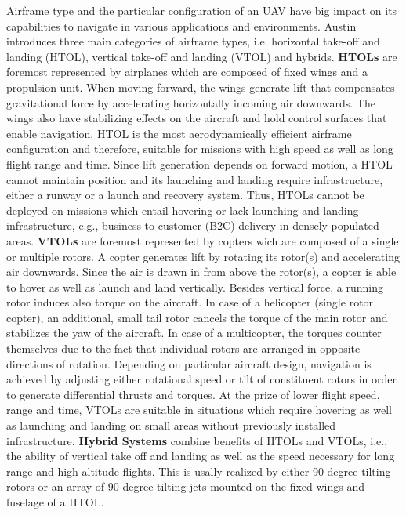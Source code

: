 Airframe type and 
the particular configuration
of an UAV
have big impact on its
capabilities to navigate in
various applications 
and environments.
\cite{Kong2010}
Austin introduces three main categories
of airframe types, i.e.
horizontal take-off and landing (HTOL),
vertical take-off and landing (VTOL)
and hybrids.
\cite{Austin2011}
\textbf{HTOLs}
are foremost represented by airplanes
which are composed of fixed wings
and a propulsion unit.
When moving forward, the wings
generate lift that compensates gravitational force
by accelerating horizontally incoming
air downwards.
The wings also have stabilizing effects
on the aircraft and hold
control surfaces that
enable navigation.
HTOL is
the most aerodynamically efficient airframe configuration
and therefore, suitable for missions
with high speed as well as
long flight range and time.
Since lift generation depends on forward motion,
a HTOL cannot maintain position and
its launching and landing 
require infrastructure, either a runway or
a launch and recovery system.
Thus, HTOLs cannot be deployed
on missions which entail
hovering or lack
launching and landing infrastructure,
e.g., business-to-customer (B2C) delivery in densely populated areas.
\textbf{VTOLs}
are foremost represented by
copters wich are composed of a single or multiple rotors.
A copter generates lift by rotating its rotor(s)
and accelerating air downwards.
Since the air is drawn in from above the rotor(s),
a copter is able to hover as well as launch and land vertically.
Besides vertical force,
a running rotor induces also torque
on the aircraft.
In case of a helicopter (single rotor copter),
an additional, small tail rotor
cancels the torque of the main rotor and 
stabilizes the yaw of the aircraft.
In case of a multicopter,
the torques counter themselves
due to the fact that individual rotors
are arranged in opposite directions of rotation.
Depending on particular aircraft design, 
navigation is achieved by
adjusting either rotational speed 
or tilt of constituent rotors
in order to
generate differential thrusts and torques.
At the prize of lower flight speed, range and time,
VTOLs are suitable in situations which
require hovering as well as launching and landing on small areas 
without previously installed infrastructure.
\textbf{Hybrid Systems}
combine benefits of HTOLs and VTOLs,
i.e., the ability of vertical take off and landing
as well as the speed necessary for 
long range and high altitude flights.
This is usally realized by
either 90 degree tilting rotors or
an array of 90 degree tilting jets mounted on 
the fixed wings and fuselage of a HTOL.

